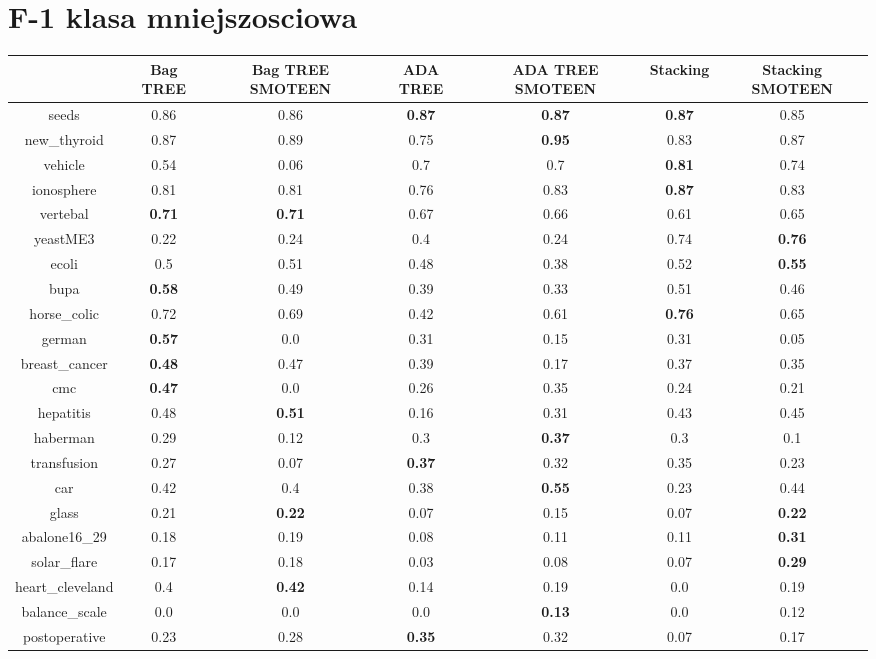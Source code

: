 \documentclass{article}%
\begin{document}
\section*{F{-}1 klasa mniejszosciowa}%
\begin{tabular}{c|cccccc}%
&Bag TREE&Bag TREE SMOTEEN&ADA TREE&ADA TREE SMOTEEN&Stacking&Stacking SMOTEEN\\%
\hline%
seeds&0.86&0.86&\textbf{0.87}&\textbf{0.87}&\textbf{0.87}&0.85\\%
new\_thyroid&0.87&0.89&0.75&\textbf{0.95}&0.83&0.87\\%
vehicle&0.54&0.06&0.7&0.7&\textbf{0.81}&0.74\\%
ionosphere&0.81&0.81&0.76&0.83&\textbf{0.87}&0.83\\%
vertebal&\textbf{0.71}&\textbf{0.71}&0.67&0.66&0.61&0.65\\%
yeastME3&0.22&0.24&0.4&0.24&0.74&\textbf{0.76}\\%
ecoli&0.5&0.51&0.48&0.38&0.52&\textbf{0.55}\\%
bupa&\textbf{0.58}&0.49&0.39&0.33&0.51&0.46\\%
horse\_colic&0.72&0.69&0.42&0.61&\textbf{0.76}&0.65\\%
german&\textbf{0.57}&0.0&0.31&0.15&0.31&0.05\\%
breast\_cancer&\textbf{0.48}&0.47&0.39&0.17&0.37&0.35\\%
cmc&\textbf{0.47}&0.0&0.26&0.35&0.24&0.21\\%
hepatitis&0.48&\textbf{0.51}&0.16&0.31&0.43&0.45\\%
haberman&0.29&0.12&0.3&\textbf{0.37}&0.3&0.1\\%
transfusion&0.27&0.07&\textbf{0.37}&0.32&0.35&0.23\\%
car&0.42&0.4&0.38&\textbf{0.55}&0.23&0.44\\%
glass&0.21&\textbf{0.22}&0.07&0.15&0.07&\textbf{0.22}\\%
abalone16\_29&0.18&0.19&0.08&0.11&0.11&\textbf{0.31}\\%
solar\_flare&0.17&0.18&0.03&0.08&0.07&\textbf{0.29}\\%
heart\_cleveland&0.4&\textbf{0.42}&0.14&0.19&0.0&0.19\\%
balance\_scale&0.0&0.0&0.0&\textbf{0.13}&0.0&0.12\\%
postoperative&0.23&0.28&\textbf{0.35}&0.32&0.07&0.17\\%
\end{tabular}

%
\end{document}
